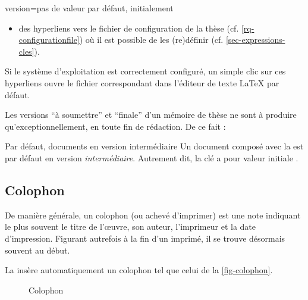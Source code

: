 {\begin{docKey}{version}{=\textbar{}\textbar{}\textbar{}\textbar{}\textbar{}}{pas
      de valeur par défaut, initialement }
\begin{description}
\begin{itemize}
\begin{enumerate}
\begin{enumerate}
\begin{itemize}
            \item des hyperliens vers le fichier de configuration de la thèse
              (cf.  \vref{rq-configurationfile}) où il est possible de les
              (re)définir (cf. \vref{sec-expressions-cles}).
            \end{itemize}
          \end{enumerate}
          Si le système d'exploitation est correctement configuré, un simple
          clic sur ces hyperliens ouvre le fichier correspondant dans l'éditeur
          de texte \LaTeX{} par défaut.
        \end{enumerate}
      \end{itemize}
    \end{description}
  \end{docKey}
}

Les versions \enquote{à soumettre} et \enquote{finale} d'un mémoire de thèse ne
sont à produire qu'exceptionnellement, en toute fin de rédaction. De ce fait :
\begin{dbwarning}{Par défaut, documents en version intermédiaire}{}
  Un document composé avec la \yatCl{} est par défaut en version
  \emph{intermédiaire}. Autrement dit, la clé  a pour valeur
  initiale .
\end{dbwarning}

\subsection{Colophon}
\label{sec-coloplhon}
%
%

De manière générale, un colophon (ou achevé d'imprimer) est une note indiquant
le plus souvent le titre de l'œuvre, son auteur, l'imprimeur et la date
d'impression. Figurant autrefois à la fin d'un imprimé, il se trouve désormais
souvent au début.

%
%
La \yatCl{} insère automatiquement un colophon tel que celui de la
\vref{fig-colophon}.
\begin{figure}[htbp]
  \centering
  \caption{Colophon}
  \label{fig-colophon}
\end{figure}

